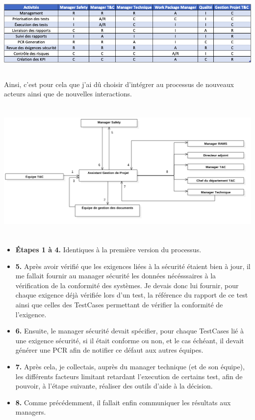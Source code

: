 \begin{center}
\includegraphics[height=4cm]{ressources/images/figures/RACI.png}
\end{center}

Ainsi, c'est pour cela que j'ai dû choisir d'intégrer au processus de nouveaux acteurs ainsi que de nouvelles interactions. 

\begin{center}
\includegraphics[height=7cm]{ressources/images/figures/Workflow2.png}
\end{center}


\begin{itemize}
\item \textbf{Étapes 1 à 4.} Identiques à la première version du processus.
\item \textbf{5.} Après avoir vérifié que les exigences liées à la sécurité étaient bien à jour, il me fallait fournir au manager sécurité les données nécésssaires à la vérification de la conformité des systèmes. Je devais donc lui fournir, pour chaque exigence déjà vérifiée lors d'un test, la référence du rapport de ce test ainsi que celles des \gls{TestCases} permettant de vérifier la conformité de l'exigence.
\item \textbf{6.} Ensuite, le manager sécurité devait spécifier, pour chaque \gls{TestCases} lié à une exigence sécurité, si il était conforme ou non, et le cas échéant, il devait générer une \gls{PCR} afin de notifier ce défaut aux autres équipes.
\item \textbf{7.} Après cela, je collectais, auprès du manager technique (et de son équipe), les différents facteurs limitant retardant l'execution de certains test, afin de pouvoir, à l'étape suivante, réaliser des outils d'aide à la décision.
\item \textbf{8.} Comme précédemment, il fallait enfin communiquer les résultats aux managers.
\end{itemize}

